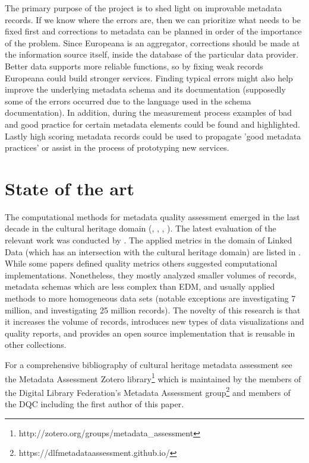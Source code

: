 The primary purpose of the project is to shed light on improvable metadata records. If we know where the errors are, then we can prioritize what needs to be fixed first and corrections to metadata can be planned in order of the importance of the problem. Since Europeana is an aggregator, corrections should be made at the information source itself, inside the database of the particular data provider. Better data supports more reliable functions, so by fixing weak records Europeana could build stronger services. Finding typical errors might also help improve the underlying metadata schema and its documentation (supposedly some of the errors occurred due to the language used in the schema documentation).  In addition, during the measurement process examples of bad and good practice for certain metadata elements could be found and highlighted. Lastly high scoring metadata records could be used to propagate 'good metadata practices' or assist in the process of prototyping new services.

\section{State of the art}

The computational methods for metadata quality assessment emerged in the last decade in the cultural heritage domain (\cite{bruce-hillmann2004}, \cite{stvilia2007}, \cite{ochoa-duval2009}, \cite{harper2016}). The latest evaluation of the relevant work was conducted by \cite{palavitsinis2014}. The applied metrics in the domain of Linked Data (which has an intersection with the cultural heritage domain) are listed in \cite{zaveri2015}. While some papers defined quality metrics others suggested computational implementations. Nonetheless, they mostly analyzed smaller volumes of records, metadata schemas which are less complex than EDM, and usually applied methods to more homogeneous data sets (notable exceptions are \cite{newman2007} investigating 7 million, and \cite{harper2016} investigating 25 million records). The novelty of this research is that it increases the volume of records, introduces new types of data visualizations and quality reports, and provides an open source implementation that is reusable in other collections.

For a comprehensive bibliography of cultural heritage metadata assessment see the Metadata Assessment Zotero library\footnote{http://zotero.org/groups/metadata\_assessment} which is maintained by the members of the Digital Library Federation’s Metadata Assessment group\footnote{https://dlfmetadataassessment.github.io/} and members of the DQC including the first author of this paper.

